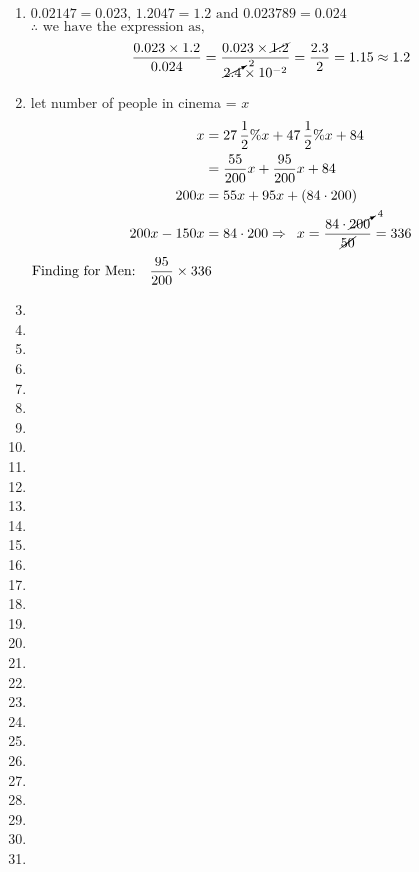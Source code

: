\begin{multicols}{2}
\begin{enumerate}[label={\textbf{\arabic*.}}]
    \item $0.02147 = 0.023, \, 1.2047 = 1.2 \text{ and } 0.023789 = 0.024$ \\
    \(\therefore \text{ we have the expression as, } \) \\
    \[\dfrac{0.023 \times 1.2}{0.024} = \dfrac{0.023 \times \cancel{1.2}}{\cancelto{2}{2.4} \times 10^{-2}} = \dfrac{2.3}{2} = 1.15 \approx 1.2\] 
    \item let number of people in cinema = $x$ 
    \begin{align*}
    x &= 27\,\dfrac{1}{2}\%x + 47\,\dfrac{1}{2}\%x + 84  \\
    &= \dfrac{55}{200}x + \dfrac{95}{200}x + 84 \\
     200x &= 55x + 95x + (84 \cdot 200) \\
     200x - 150x &= 84 \cdot 200 
    \Rightarrow \hspace{5px} x = \dfrac{84 \cdot \cancelto{4}{200}}{\cancel{50}}  = 336 
    \end{align*}
    $\text{Finding for Men:} \hspace{10px} \dfrac{95}{200} \times 336$
    \item
    \item
    \item 
    \item
    \item
    \item 
    \item 
    \item 
    \item 
    \item
    \item
    \item
    \item 
    \item
    \item
    \item 
    \item 
    \item 
    \item 
    \item
    \item
    \item
    \item 
    \item
    \item
    \item 
    \item 
    \item 
    \item 

\end{enumerate}
\end{multicols}
